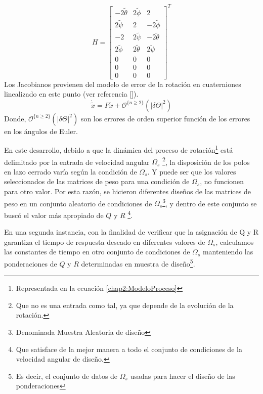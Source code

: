 \documentclass[10pt]{report}
\numberwithin{equation}{chapter}
\numberwithin{algorithm}{chapter}
\newcommand{\bcite}[1]{[\cite{#1}]}
\begin{document}
\begin{equation}
H=\begin{bmatrix}
-2\tilde{\theta}&2\tilde{\phi}&2\\
2\tilde{\psi}&2&-2\tilde{\phi}\\
-2&2\tilde{\psi}&-2\tilde{\theta}\\
2\tilde{\phi}&2\tilde{\theta}&2\tilde{\psi}\\
0&0&0\\
0&0&0\\
0&0&0
\end{bmatrix}^T
\end{equation}
Los Jacobianos provienen del modelo de error de la rotación en cuaterniones linealizado en este punto (ver referencia \bcite{Sola2012}).
\begin{equation}
\dot{\tilde{x}}=F\tilde{x}+\mathcal{O}^{\{n\geq2\}}(|\delta\Theta|^2)
\end{equation}
Donde, $\mathcal{O}^{\{n\geq2\}}(|\delta\Theta|^2)$ son los errores de orden superior función de los errores en los ángulos de Euler.\par
En este desarrollo, debido a que la dinámica del proceso de rotación\footnote{Representada en la ecuación \eqref{chap2:ModeloProceso}} está delimitado por la entrada de velocidad angular $\Omega_s$ \footnote{Que no es una entrada como tal, ya que depende de la evolución de la rotación.}, la disposición de los polos en lazo cerrado varía según la condición de $\Omega_s$. Y puede ser que los valores seleccionados de las matrices de peso para una condición de $\Omega_s$, no funcionen para otro valor. Por esta razón, se hicieron diferentes diseños de las matrices de peso en un conjunto aleatorio de condiciones de $\Omega_s$\footnote{Denominada Muestra Aleatoria de diseño}, y dentro de este conjunto se buscó el valor más apropiado de $Q$ y $R$ \footnote{Que satisface de la mejor manera a todo el conjunto de condiciones de la velocidad angular de diseño.}.\par
En una segunda instancia, con la finalidad de verificar que la asignación de Q y R garantiza el tiempo de respuesta deseado en diferentes valores de $\Omega_s$, calculamos las constantes de tiempo en otro conjunto de condiciones de $\Omega_s$ manteniendo las ponderaciones de $Q$ y $R$ determinadas en muestra de diseño\footnote{Es decir, el conjunto de datos de $\Omega_s$ usadas para hacer el diseño de las ponderaciones}.\par
\end{document}
